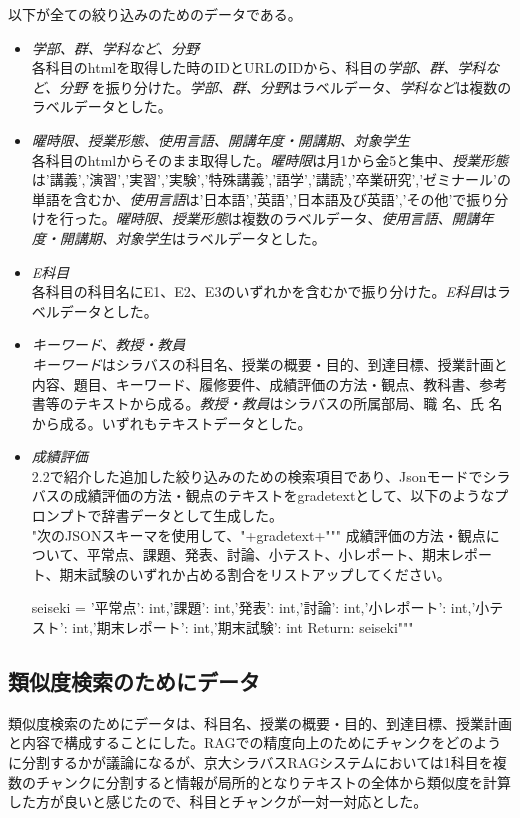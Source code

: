 以下が全ての絞り込みのためのデータである。\\

\begin{itemize}
  \item \emph{学部、群、学科など、分野} \\
  各科目のhtmlを取得した時のIDとURLのIDから、科目の\emph{学部、群、学科など、分野} を振り分けた。\emph{学部、群、分野}はラベルデータ、\emph{学科など}は複数のラベルデータとした。\\
  \item \emph{曜時限、授業形態、使用言語、開講年度・開講期、対象学生}\\
  各科目のhtmlからそのまま取得した。\emph{曜時限}は月1から金5と集中、\emph{授業形態}は'講義','演習','実習','実験','特殊講義','語学','講読','卒業研究','ゼミナール'の単語を含むか、\emph{使用言語}は'日本語','英語','日本語及び英語','その他'で振り分けを行った。\emph{曜時限、授業形態}は複数のラベルデータ、\emph{使用言語、開講年度・開講期、対象学生}はラベルデータとした。\\
  \item \emph{E科目}\\
  各科目の科目名にE1、E2、E3のいずれかを含むかで振り分けた。\emph{E科目}はラベルデータとした。\\
  \item \emph{キーワード、教授・教員}\\
  \emph{キーワード}はシラバスの科目名、授業の概要・目的、到達目標、授業計画と内容、題目、キーワード、履修要件、成績評価の方法・観点、教科書、参考書等のテキストから成る。\emph{教授・教員}はシラバスの所属部局、職 名、氏 名から成る。いずれもテキストデータとした。\\
  \item \emph{成績評価}\\
  2.2で紹介した追加した絞り込みのための検索項目であり、Jsonモードでシラバスの成績評価の方法・観点のテキストをgradetextとして、以下のようなプロンプトで辞書データとして生成した。\\
  "次のJSONスキーマを使用して、"+gradetext+"""
        成績評価の方法・観点について、平常点、課題、発表、討論、小テスト、小レポート、期末レポート、期末試験のいずれか占める割合をリストアップしてください。
    
        seiseki = {'平常点': int,'課題': int,'発表': int,'討論': int,'小レポート': int,'小テスト': int,'期末レポート': int,'期末試験': int}
        Return: seiseki"""
\end{itemize}

\subsection{類似度検索のためにデータ}
類似度検索のためにデータは、科目名、授業の概要・目的、到達目標、授業計画と内容で構成することにした。RAGでの精度向上のためにチャンクをどのように分割するかが議論になるが、京大シラバスRAGシステムにおいては1科目を複数のチャンクに分割すると情報が局所的となりテキストの全体から類似度を計算した方が良いと感じたので、科目とチャンクが一対一対応とした。\\

